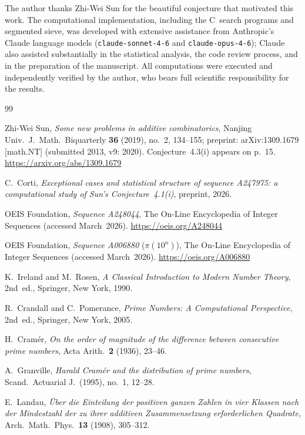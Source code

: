 \documentclass{amsart}
\theoremstyle{definition}
\theoremstyle{remark}
\numberwithin{equation}{section}
\begin{document}
The author thanks Zhi-Wei Sun for the beautiful conjecture that
motivated this work.
The computational implementation, including the C~search programs
and segmented sieve, was developed with extensive assistance from
Anthropic's Claude language models (\texttt{claude-sonnet-4-6} and
\texttt{claude-opus-4-6}); Claude also assisted substantially in
the statistical analysis, the code review process, and in the
preparation of the manuscript.
All computations were executed and independently verified by the
author, who bears full scientific responsibility for the results.


\begin{thebibliography}{99}

Zhi-Wei Sun,
\textit{Some new problems in additive combinatorics},
Nanjing Univ.\ J.\ Math.\ Biquarterly \textbf{36} (2019), no.~2,
134--155; preprint: arXiv:1309.1679 [math.NT] (submitted 2013,
v9: 2020).
Conjecture~4.3(i) appears on p.~15.
\url{https://arxiv.org/abs/1309.1679}

C.~Corti,
\textit{Exceptional cases and statistical structure of sequence
A247975: a computational study of Sun's Conjecture~4.1(i)},
preprint, 2026.

OEIS Foundation,
\textit{Sequence A248044},
The On-Line Encyclopedia of Integer Sequences
(accessed March~2026).
\url{https://oeis.org/A248044}

OEIS Foundation,
\textit{Sequence A006880} ($\pi(10^n)$),
The On-Line Encyclopedia of Integer Sequences
(accessed March~2026).
\url{https://oeis.org/A006880}

K.~Ireland and M.~Rosen,
\textit{A Classical Introduction to Modern Number Theory},
2nd~ed., Springer, New York, 1990.

R.~Crandall and C.~Pomerance,
\textit{Prime Numbers: A Computational Perspective},
2nd~ed., Springer, New York, 2005.

H.~Cram\'er,
\textit{On the order of magnitude of the difference between
consecutive prime numbers},
Acta Arith.\ \textbf{2} (1936), 23--46.

A.~Granville,
\textit{Harald Cram\'er and the distribution of prime numbers},
Scand.\ Actuarial J.\ (1995), no.~1, 12--28.

E.~Landau,
\textit{\"Uber die Einteilung der positiven ganzen Zahlen in vier
Klassen nach der Mindestzahl der zu ihrer additiven Zusammensetzung
erforderlichen Quadrate},
Arch.\ Math.\ Phys.\ \textbf{13} (1908), 305--312.


\end{thebibliography}
\end{document}
